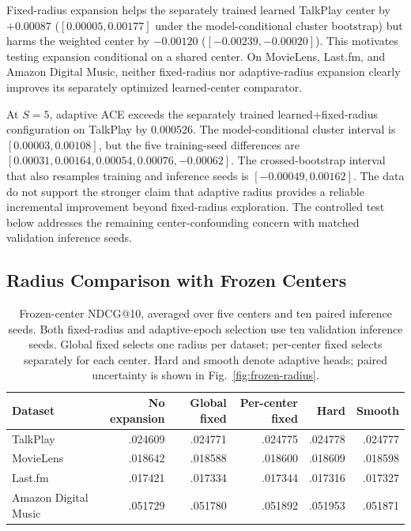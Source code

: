 \documentclass[runningheads]{llncs}
\newcommand{\method}{\textsc{ACE}}
\begin{document}
Fixed-radius expansion helps the separately trained learned TalkPlay center by $+0.00087$
($[0.00005,0.00177]$ under the model-conditional cluster bootstrap) but harms
the weighted center by $-0.00120$ ($[-0.00239,-0.00020]$). This motivates testing
expansion conditional on a shared center. On MovieLens, Last.fm, and
Amazon Digital Music, neither fixed-radius nor adaptive-radius expansion clearly
improves its separately optimized learned-center comparator.

At $S=5$, adaptive \method{} exceeds the separately trained
learned+fixed-radius configuration on TalkPlay by 0.000526. The
model-conditional cluster interval is $[0.00003,0.00108]$, but the five
training-seed differences are $[0.00031,0.00164,0.00054,0.00076,-0.00062]$.
The crossed-bootstrap interval that also resamples training and inference seeds is
$[-0.00049,0.00162]$. The data do not support the stronger claim that adaptive
radius provides a reliable incremental improvement beyond fixed-radius
exploration. The controlled test below addresses the remaining
center-confounding concern with matched validation inference seeds.

\subsection{Radius Comparison with Frozen Centers}
\label{sec:frozen-results}

\begin{table}[t]
\centering\scriptsize
\setlength{\tabcolsep}{2pt}
\caption{Frozen-center NDCG@10, averaged over five centers and ten paired
inference seeds. Both fixed-radius and adaptive-epoch selection use ten
validation inference seeds. Global fixed selects one radius per dataset;
per-center fixed selects separately for each center. Hard and smooth denote
adaptive heads; paired uncertainty is shown in Fig.~\ref{fig:frozen-radius}.}
\label{tab:frozen-center-radius}
\begin{tabular}{lrrrrr}
\toprule
Dataset & No expansion & Global fixed & Per-center fixed & Hard & Smooth\\
\midrule
TalkPlay & .024609 & .024771 & .024775 & .024778 & .024777\\
MovieLens & .018642 & .018588 & .018600 & .018609 & .018598\\
Last.fm & .017421 & .017334 & .017344 & .017316 & .017327\\
Amazon Digital Music & .051729 & .051780 & .051892 & .051953 & .051871\\
\bottomrule
\end{tabular}
\end{table}
\end{document}
